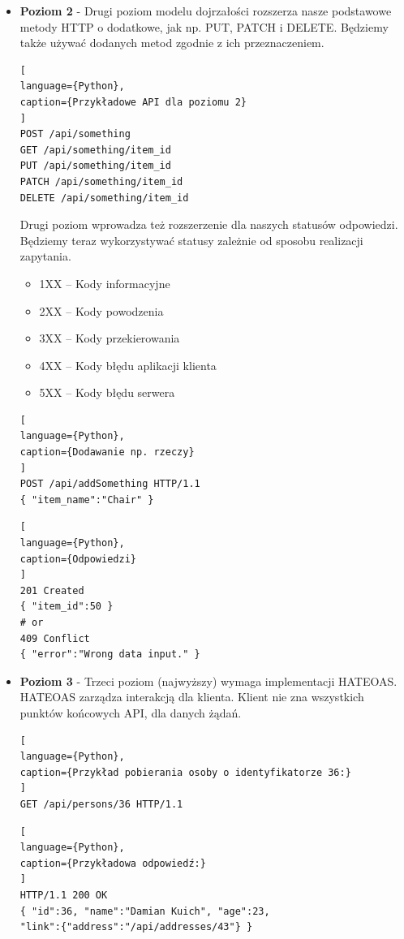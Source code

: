 \documentclass[oneside,polski,logo,indent]{amuthesis}
\begin{document}
\begin{itemize}
\item \textbf{Poziom 2} - Drugi poziom modelu dojrzałości rozszerza nasze podstawowe metody HTTP o dodatkowe, jak np. PUT, PATCH i DELETE. Będziemy także używać dodanych metod zgodnie z ich przeznaczeniem.

\begin{lstlisting}[
language={Python},
caption={Przykładowe API dla poziomu 2}
]
POST /api/something
GET /api/something/item_id
PUT /api/something/item_id
PATCH /api/something/item_id
DELETE /api/something/item_id
\end{lstlisting}

Drugi poziom wprowadza też rozszerzenie dla naszych statusów odpowiedzi. Będziemy teraz wykorzystywać statusy zależnie od sposobu realizacji zapytania.
\begin{itemize}
\item 1XX – Kody informacyjne
\item 2XX – Kody powodzenia
\item 3XX – Kody przekierowania
\item 4XX – Kody błędu aplikacji klienta
\item 5XX – Kody błędu serwera
\end{itemize}

\begin{lstlisting}[
language={Python},
caption={Dodawanie np. rzeczy}
]
POST /api/addSomething HTTP/1.1
{ "item_name":"Chair" }
\end{lstlisting}

\begin{lstlisting}[
language={Python},
caption={Odpowiedzi}
]
201 Created
{ "item_id":50 }
# or
409 Conflict
{ "error":"Wrong data input." }
\end{lstlisting}

\item \textbf{Poziom 3} - Trzeci poziom (najwyższy) wymaga implementacji HATEOAS. HATEOAS zarządza interakcją dla klienta. Klient nie zna wszystkich punktów końcowych API, dla danych żądań.

\begin{lstlisting}[
language={Python},
caption={Przykład pobierania osoby o identyfikatorze 36:}
]
GET /api/persons/36 HTTP/1.1
\end{lstlisting}

\begin{lstlisting}[
language={Python},
caption={Przykładowa odpowiedź:}
]
HTTP/1.1 200 OK
{ "id":36, "name":"Damian Kuich", "age":23,
"link":{"address":"/api/addresses/43"} }
\end{lstlisting} 

\end{itemize}
\end{document}
